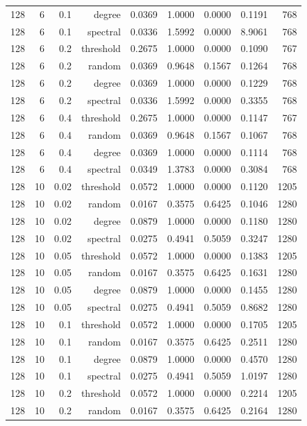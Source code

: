 \begin{table}[t]
\begin{tabular}{lrrrrrrrr}
128 & 6 & 0.1 & degree & 0.0369 & 1.0000 & 0.0000 & 0.1191 & 768 \\
128 & 6 & 0.1 & spectral & 0.0336 & 1.5992 & 0.0000 & 8.9061 & 768 \\
128 & 6 & 0.2 & threshold & 0.2675 & 1.0000 & 0.0000 & 0.1090 & 767 \\
128 & 6 & 0.2 & random & 0.0369 & 0.9648 & 0.1567 & 0.1264 & 768 \\
128 & 6 & 0.2 & degree & 0.0369 & 1.0000 & 0.0000 & 0.1229 & 768 \\
128 & 6 & 0.2 & spectral & 0.0336 & 1.5992 & 0.0000 & 0.3355 & 768 \\
128 & 6 & 0.4 & threshold & 0.2675 & 1.0000 & 0.0000 & 0.1147 & 767 \\
128 & 6 & 0.4 & random & 0.0369 & 0.9648 & 0.1567 & 0.1067 & 768 \\
128 & 6 & 0.4 & degree & 0.0369 & 1.0000 & 0.0000 & 0.1114 & 768 \\
128 & 6 & 0.4 & spectral & 0.0349 & 1.3783 & 0.0000 & 0.3084 & 768 \\
128 & 10 & 0.02 & threshold & 0.0572 & 1.0000 & 0.0000 & 0.1120 & 1205 \\
128 & 10 & 0.02 & random & 0.0167 & 0.3575 & 0.6425 & 0.1046 & 1280 \\
128 & 10 & 0.02 & degree & 0.0879 & 1.0000 & 0.0000 & 0.1180 & 1280 \\
128 & 10 & 0.02 & spectral & 0.0275 & 0.4941 & 0.5059 & 0.3247 & 1280 \\
128 & 10 & 0.05 & threshold & 0.0572 & 1.0000 & 0.0000 & 0.1383 & 1205 \\
128 & 10 & 0.05 & random & 0.0167 & 0.3575 & 0.6425 & 0.1631 & 1280 \\
128 & 10 & 0.05 & degree & 0.0879 & 1.0000 & 0.0000 & 0.1455 & 1280 \\
128 & 10 & 0.05 & spectral & 0.0275 & 0.4941 & 0.5059 & 0.8682 & 1280 \\
128 & 10 & 0.1 & threshold & 0.0572 & 1.0000 & 0.0000 & 0.1705 & 1205 \\
128 & 10 & 0.1 & random & 0.0167 & 0.3575 & 0.6425 & 0.2511 & 1280 \\
128 & 10 & 0.1 & degree & 0.0879 & 1.0000 & 0.0000 & 0.4570 & 1280 \\
128 & 10 & 0.1 & spectral & 0.0275 & 0.4941 & 0.5059 & 1.0197 & 1280 \\
128 & 10 & 0.2 & threshold & 0.0572 & 1.0000 & 0.0000 & 0.2214 & 1205 \\
128 & 10 & 0.2 & random & 0.0167 & 0.3575 & 0.6425 & 0.2164 & 1280 \\

\end{tabular}
\end{table}
